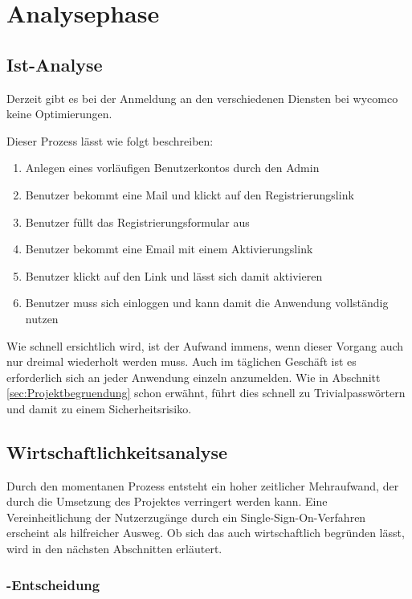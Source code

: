 \section{Analysephase} 
\label{sec:Analysephase}


\subsection{Ist-Analyse} 
\label{sec:IstAnalyse}

Derzeit gibt es bei der Anmeldung an den verschiedenen Diensten bei wycomco keine Optimierungen. 

Dieser Prozess lässt wie folgt beschreiben:
\begin{enumerate}
	\item Anlegen eines vorläufigen Benutzerkontos durch den Admin
	\item Benutzer bekommt eine Mail und klickt auf den Registrierungslink
	\item Benutzer füllt das Registrierungsformular aus
	\item Benutzer bekommt eine Email mit einem Aktivierungslink
	\item Benutzer klickt auf den Link und lässt sich damit aktivieren
	\item Benutzer muss sich einloggen und kann damit die Anwendung vollständig nutzen
\end{enumerate}

Wie schnell ersichtlich wird, ist der Aufwand immens, wenn dieser Vorgang auch nur dreimal wiederholt werden muss.
Auch im täglichen Geschäft ist es erforderlich sich an jeder Anwendung einzeln anzumelden. Wie in Abschnitt \ref{sec:Projektbegruendung} schon erwähnt, führt dies schnell zu Trivialpasswörtern und damit zu einem Sicherheitsrisiko. 

\subsection{Wirtschaftlichkeitsanalyse}
\label{sec:Wirtschaftlichkeitsanalyse}

Durch den momentanen Prozess entsteht ein hoher zeitlicher Mehraufwand, der durch die Umsetzung des Projektes verringert werden kann.
Eine Vereinheitlichung der Nutzerzugänge durch ein Single-Sign-On-Verfahren erscheint als hilfreicher Ausweg.
Ob sich das auch wirtschaftlich begründen lässt, wird in den nächsten Abschnitten erläutert.

\subsubsection{-Entscheidung}
\label{sec:MakeOrBuyEntscheidung}

